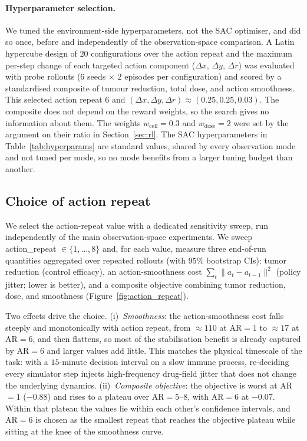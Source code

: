 \documentclass{article}
\begin{document}
\paragraph{Hyperparameter selection.}
We tuned the environment-side hyperparameters, not the SAC optimiser, and did so
once, before and independently of the observation-space comparison. A Latin
hypercube design of $20$ configurations over the action repeat and the maximum
per-step change of each targeted action component ($\Delta x$, $\Delta y$,
$\Delta r$) was evaluated with probe rollouts ($6$ seeds $\times$ $2$ episodes
per configuration) and scored by a standardised composite of tumour reduction,
total dose, and action smoothness. This selected action repeat $6$ and
$(\Delta x,\Delta y,\Delta r)\approx(0.25,0.25,0.03)$. The composite does not
depend on the reward weights, so the search gives no information about them.
The weights $w_{\text{cell}}=0.3$ and $w_{\text{dose}}=2$ were set by the
argument on their ratio in Section~\ref{sec:rl}. The SAC hyperparameters in
Table~\ref{tab:hyperparams} are standard values, shared by every observation mode
and not tuned per mode, so no mode benefits from a larger tuning budget than
another.

\subsection{Choice of action repeat}
\label{app:actionrepeat}

We select the action-repeat value with a dedicated sensitivity sweep, run
independently of the main observation-space experiments. We sweep
action\_repeat $\in\{1,\dots,8\}$ and, for each value, measure three end-of-run
quantities aggregated over repeated rollouts (with $95\%$ bootstrap CIs):
tumor reduction (control efficacy), an action-smoothness cost
$\sum_t\|a_t-a_{t-1}\|^2$ (policy jitter; lower is better), and a composite
objective combining tumor reduction, dose, and smoothness
(Figure~\ref{fig:action_repeat}).

Two effects drive the choice. (i)~\emph{Smoothness}: the action-smoothness cost
falls steeply and monotonically with action repeat, from ${\approx}110$ at
AR$=1$ to ${\approx}17$ at AR$=6$, and then flattens, so most of the
stabilisation benefit is already captured by AR$=6$ and larger values add little.
This matches the physical timescale of the task: with a $15$-minute decision
interval on a slow immune process, re-deciding every simulator step injects
high-frequency drug-field jitter that does not change the underlying dynamics.
(ii)~\emph{Composite objective}: the objective is worst at AR$=1$
($-0.88$) and rises to a plateau over AR$=5$--$8$, with AR$=6$ at
$-0.07$. Within that plateau the values lie within each other's confidence
intervals, and AR$=6$ is chosen as the smallest repeat that reaches the
objective plateau while sitting at the knee of the smoothness curve.
\end{document}
